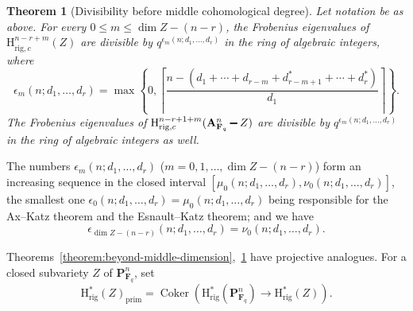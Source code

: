 \documentclass{amsart}
\numberwithin{equation}{section}
\theoremstyle{plain}
\newtheorem{theorem}[equation]{Theorem}
\theoremstyle{definition}
\renewcommand{\mathbb}{\mathbf}
\renewcommand{\setminus}{\mathbin{\rule[0.2em]{0.67em}{0.12em}}}%
\begin{document}
\begin{theorem}[Divisibility before middle cohomological degree]
  \label{theorem:before-middle-dimension}
  Let notation be as above. For every \(0\leq m \leq \dim Z - (n-r)\),
  the Frobenius eigenvalues of \(\mathrm{H}^{n-r+m}_{\mathrm{rig},c}(Z)\)
  are divisible by \(q^{\epsilon_m(n;d_1,\ldots,d_r)}\) in the ring of algebraic
  integers, where
  \begin{equation*}
    \epsilon_m(n;d_1,\ldots,d_r) =
    \max\left\{ 0, \left\lceil \frac{n-(d_1+\cdots + d_{r-m}+d_{r-m+1}^*+\cdots + d_{r}^{*})}{d_1}\right\rceil \right\}.
  \end{equation*}
  The Frobenius eigenvalues of
  \(\mathrm{H}^{n-r+1+m}_{\mathrm{rig},c}(\mathbb{A}^n_{\mathbb{F}_q}\setminus Z)\) are divisible
  by \(q^{\epsilon_m(n;d_1,\ldots,d_r)}\) in the ring of algebraic integers as well.
\end{theorem}

The numbers \(\epsilon_{m}(n;d_1,\ldots,d_r)\) (\(m=0,1,\ldots, \dim Z-(n-r)\)) form an increasing
sequence in the closed interval \([\mu_0(n;d_1,\ldots,d_r),\nu_0(n;d_1,\ldots,d_r)]\),
the smallest one \(\epsilon_0(n;d_1,\ldots,d_r)=\mu_0(n;d_1,\ldots,d_r)\)
being responsible for the Ax--Katz theorem and the Esnault--Katz theorem; and we have
\[\epsilon_{\dim Z-(n-r)}(n;d_1,\ldots,d_r)=\nu_0(n;d_1,\ldots,d_r).\]

\medskip
Theorems~\ref{theorem:beyond-middle-dimension},~\ref{theorem:before-middle-dimension}
have projective analogues.
For a closed subvariety \(Z\) of \(\mathbb{P}^n_{\mathbb{F}_q}\), set
\[
\mathrm{H}^{\ast}_{\mathrm{rig}}(Z)_{\mathrm{prim}}=
\operatorname{Coker}(\mathrm{H}^{\ast}_{\mathrm{rig}}(\mathbb{P}_{\mathbb{F}_q}^n) \to \mathrm{H}^{\ast}_{\mathrm{rig}}(Z)).
\]
\end{document}
